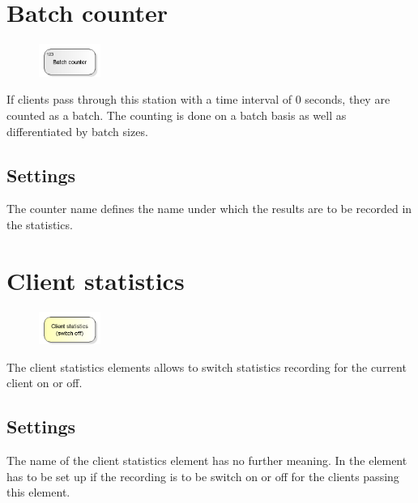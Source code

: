 \section{Batch counter}
\label{ref:ModelElementCounterBatch}

\begin{figure}
\vspace{-22pt}
\includegraphics[width=2cm]{imageModelElementCounterBatch.png}
\vspace{-22pt}
\end{figure}

If clients pass through this station with a time interval of 0 seconds, they are counted as a batch.
The counting is done on a batch basis as well as differentiated by batch sizes.

\subsection*{Settings}

The counter name defines the name under which the results are to be recorded in the statistics.


\section{Client statistics}
\label{ref:ModelElementSetStatisticsMode}

\begin{figure}
\vspace{-22pt}
\includegraphics[width=2cm]{imageModelElementSetStatisticsMode.png}
\vspace{-22pt}
\end{figure}

The client statistics elements allows to switch statistics recording
for the current client on or off.

\subsection*{Settings}

The name of the client statistics element has no further meaning.
In the element has to be set up if the recording is to be switch on or off
for the clients passing this element.


